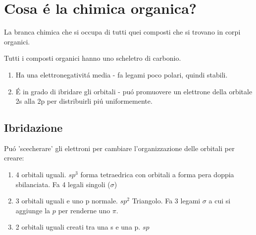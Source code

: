 \documentclass{article}
\title{\jobname}
\author{Eugenio Animali}
\begin{document}
\maketitle

\section{Cosa é la chimica organica?}
La branca chimica che si occupa di tutti quei composti che si trovano in corpi organici.

Tutti i composti organici hanno uno scheletro di carbonio. 

\begin{enumerate}
    \item Ha una elettronegativitá media - fa legami poco polari, quindi stabili.
    \item É in grado di ibridare gli orbitali - puó promuovere un elettrone della orbitale 2s alla 2p per distribuirli piú uniformemente.
\end{enumerate}
\subsection{Ibridazione}
Puó 'scecherare' gli elettroni per cambiare l'organizzazione delle orbitali per creare:
\begin{enumerate}
    \item 4 orbitali uguali. $sp^3$ forma tetraedrica con orbitali a forma pera doppia sbilanciata. Fa 4 legali singoli ($\sigma$)
    \item 3 orbitali uguali e uno p normale. $sp^2$ Triangolo. Fa 3 legami $\sigma$ a cui si aggiunge la $p$ per renderne uno $\pi$.
    \item 2 orbitali uguali creati tra una s e una p. $sp$
\end{enumerate}
\end{document}
